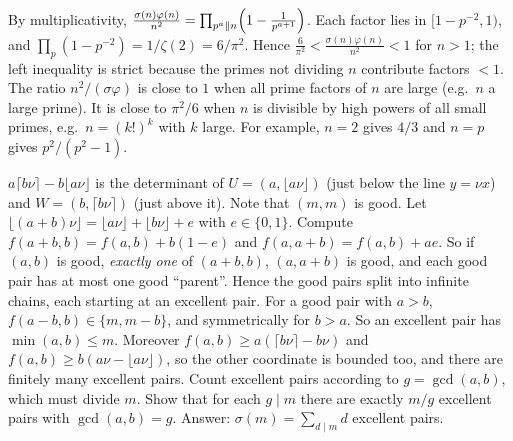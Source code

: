 \documentclass[11pt,a4paper]{article}
\begin{document}
 By multiplicativity, $\frac{\sigma(n)\varphi(n)}{n^2}=\prod_{p^a\Vert n}\Bigl(1-\frac1{p^{a+1}}\Bigr)$.
 Each factor lies in $[1-p^{-2},1)$, and $\prod_p(1-p^{-2})=1/\zeta(2)=6/\pi^2$. Hence $\frac6{\pi^2}<\frac{\sigma(n)\varphi(n)}{n^2}<1$ for $n>1$; the left inequality is strict because the primes not dividing $n$ contribute factors $<1$.
 The ratio $n^2/(\sigma\varphi)$ is close to $1$ when all prime factors of $n$ are large (e.g.\ $n$ a large prime). It is close to $\pi^2/6$ when $n$ is divisible by high powers of all small primes, e.g.\ $n=(k!)^k$ with $k$ large. For example, $n=2$ gives $4/3$ and $n=p$ gives $p^2/(p^2-1)$.

 $a\lceil b\nu\rceil-b\lfloor a\nu\rfloor$ is the determinant of $U=(a,\lfloor a\nu\rfloor)$ (just below the line $y=\nu x$) and $W=(b,\lceil b\nu\rceil)$ (just above it). Note that $(m,m)$ is good.
 Let $\lfloor(a+b)\nu\rfloor=\lfloor a\nu\rfloor+\lfloor b\nu\rfloor+e$ with $e\in\{0,1\}$. Compute $f(a+b,b)=f(a,b)+b(1-e)$ and $f(a,a+b)=f(a,b)+ae$. So if $(a,b)$ is good, \emph{exactly one} of $(a+b,b)$, $(a,a+b)$ is good, and each good pair has at most one good ``parent''.
 Hence the good pairs split into infinite chains, each starting at an excellent pair. For a good pair with $a>b$, $f(a-b,b)\in\{m,m-b\}$, and symmetrically for $b>a$. So an excellent pair has $\min(a,b)\le m$. Moreover $f(a,b)\ge a(\lceil b\nu\rceil-b\nu)$ and $f(a,b)\ge b(a\nu-\lfloor a\nu\rfloor)$, so the other coordinate is bounded too, and there are finitely many excellent pairs.
 Count excellent pairs according to $g=\gcd(a,b)$, which must divide $m$. Show that for each $g\mid m$ there are exactly $m/g$ excellent pairs with $\gcd(a,b)=g$. Answer: $\sigma(m)=\sum_{d\mid m}d$ excellent pairs.
\end{document}
